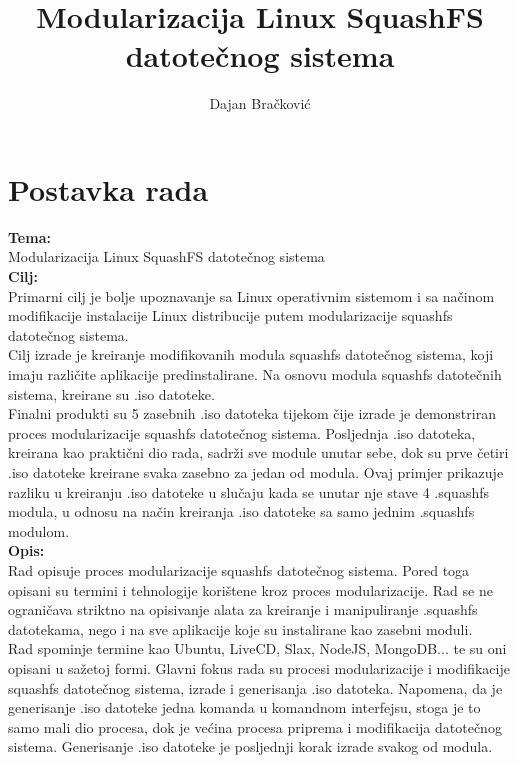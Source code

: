 \documentclass[12pt,vi]{mitthesis}
\begin{document}
\author{Dajan Bračković}
\title{Modularizacija Linux SquashFS datotečnog sistema}

\maketitle

\tableofcontents{}

\chapter*{Postavka rada}
\noindent
\textbf{Tema:}\\
\indent
Modularizacija Linux SquashFS datotečnog sistema\\
\noindent
\textbf{Cilj:}\\
\indent
Primarni cilj je bolje upoznavanje sa Linux operativnim sistemom i sa načinom modifikacije instalacije Linux distribucije putem modularizacije squashfs datotečnog sistema.\\
Cilj izrade je kreiranje modifikovanih modula squashfs datotečnog sistema, koji imaju različite aplikacije predinstalirane. Na osnovu modula squashfs datotečnih sistema, kreirane su .iso datoteke.\\
Finalni produkti su 5 zasebnih .iso datoteka tijekom čije izrade je demonstriran proces modularizacije squashfs datotečnog sistema. Posljednja .iso datoteka, kreirana kao praktični dio rada, sadrži sve module unutar sebe, dok su prve četiri .iso datoteke kreirane svaka zasebno za jedan od modula. Ovaj primjer prikazuje razliku u kreiranju .iso datoteke u slučaju kada se unutar nje stave 4 .squashfs modula, u odnosu na način kreiranja .iso datoteke sa samo jednim .squashfs modulom.\\
\noindent
\textbf{Opis:}\\
\indent
Rad opisuje proces modularizacije squashfs datotečnog sistema. Pored toga opisani su termini i tehnologije korištene kroz proces modularizacije. Rad se ne ograničava striktno na opisivanje alata za kreiranje i manipuliranje .squashfs datotekama, nego i na sve aplikacije koje su instalirane kao zasebni moduli.\\
\indent
Rad spominje termine kao Ubuntu, LiveCD, Slax, NodeJS, MongoDB... te su oni opisani u sažetoj formi. Glavni fokus rada su procesi modularizacije i modifikacije squashfs datotečnog sistema, izrade i generisanja .iso datoteka. Napomena, da je generisanje .iso datoteke jedna komanda u komandnom interfejsu, stoga je to samo mali dio procesa, dok je većina procesa priprema i modifikacija datotečnog sistema. Generisanje .iso datoteke je posljednji korak izrade svakog od modula.
\end{document}
